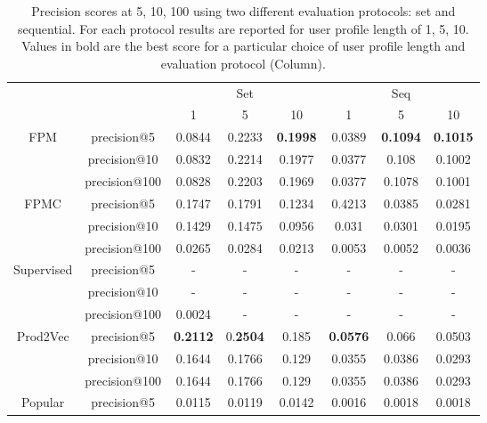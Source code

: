 \documentclass[prodmode,acmtecs]{acmsmall} %
\begin{document}
\begin{table}[htbp]
	\centering
	\caption{Precision scores at 5, 10, 100 using two different evaluation protocols: set and sequential. For each protocol results are reported for user profile length of 1, 5, 10. Values in bold are the best score for a particular choice of user profile length and evaluation protocol (Column).}
	\begin{tabular}{|c|c|c|c|c|c|c|c|}
		\cmidrule{3-8}    \multicolumn{1}{c}{} &       & \multicolumn{3}{c|}{Set} & \multicolumn{3}{c|}{Seq} \\
		\cmidrule{3-8}    \multicolumn{1}{c}{} &       & 1     & 5     & 10    & 1     & 5     & 10 \\
		\midrule
		\multirow{3}[6]{*}{FPM} & precision@5 & 0.0844 & 0.2233 & \textbf{0.1998} & 0.0389 & \textbf{0.1094} & \textbf{0.1015} \\
		\cmidrule{2-8}          & precision@10 & 0.0832 & 0.2214 & 0.1977 & 0.0377 & 0.108 & 0.1002 \\
		\cmidrule{2-8}          & precision@100 & 0.0828 & 0.2203 & 0.1969 & 0.0377 & 0.1078 & 0.1001 \\
		\midrule
		\multirow{3}[6]{*}{FPMC} & precision@5 & 0.1747 & 0.1791 & 0.1234 & 0.4213 & 0.0385 & 0.0281 \\
		\cmidrule{2-8}          & precision@10 & 0.1429 & 0.1475 & 0.0956 & 0.031 & 0.0301 & 0.0195 \\
		\cmidrule{2-8}          & precision@100 & 0.0265 & 0.0284 & 0.0213 & 0.0053 & 0.0052 & 0.0036 \\
		\midrule
		\multirow{3}[6]{*}{Supervised} & precision@5 & -     & -     & -     & -     & -     & - \\
		\cmidrule{2-8}          & precision@10 & -     & -     & -     & -     & -     & - \\
		\cmidrule{2-8}          & precision@100 & 0.0024 & -     & -     & -     & -     & - \\
		\midrule
		\multirow{3}[6]{*}{Prod2Vec} & precision@5 & \textbf{0.2112} & 0.\textbf{2504} & 0.185 & \textbf{0.0576} & 0.066 & 0.0503 \\
		\cmidrule{2-8}          & precision@10 & 0.1644 & 0.1766 & 0.129 & 0.0355 & 0.0386 & 0.0293 \\
		\cmidrule{2-8}          & precision@100 & 0.1644 & 0.1766 & 0.129 & 0.0355 & 0.0386 & 0.0293 \\
		\midrule
		\multirow{3}[6]{*}{Popular} & precision@5 & 0.0115 & 0.0119 & 0.0142 & 0.0016 & 0.0018 & 0.0018 \\

\end{tabular}
\end{table}
\end{document}
